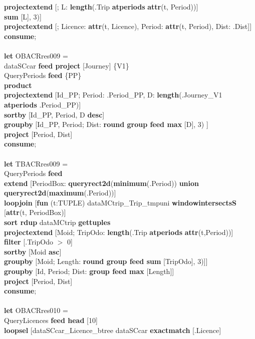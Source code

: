 \documentclass[a4paper]{article}
\newcommand{\op}[1]{\textbf{#1}}
\begin{document}
\begin{scriptsize}
\begin{tabbing}
\>\>\>\>\op{projectextend} [; L: \op{length}(.Trip \op{atperiods} \op{attr}(t, Period))]\\
\>\>\>\op{sum} [L], 3)]\\
\>\>\op{projectextend} [; Licence: \op{attr}(t, Licence), Period: \op{attr}(t, Period), Dist: .Dist]]\\
\op{consume};\\
\\
\op{let} OBACRres009 =\\
\>dataSCcar \op{feed project} [Journey] \{V1\}\\
\>QueryPeriods \op{feed} \{PP\}\\
\>\op{product}\\
\>\op{projectextend} [Id\_PP; Period: .Period\_PP, D: \op{length}(.Journey\_V1 \op{atperiods} .Period\_PP)]\\
\>\op{sortby} [Id\_PP, Period, D \op{desc}]\\
\>\op{groupby} [Id\_PP, Period; Dist: \op{round group feed max} [D], 3) ]\\
\>\op{project} [Period, Dist]\\
\op{consume};\\
\\
\op{let} TBACRres009 =\\
\>QueryPeriods \op{feed}\\
\>\op{extend} [PeriodBox: \op{queryrect2d}(\op{minimum}(.Period)) \op{union queryrect2d}(\op{maximum}(.Period))]\\
\>\op{loopjoin} [\op{fun} (t:TUPLE) dataMCtrip\_Trip\_tmpuni \op{windowintersectsS} [\op{attr}(t, PeriodBox)]\\
\>\>\op{sort rdup} dataMCtrip \op{gettuples}\\
\>\>\op{projectextend} [Moid; TripOdo: \op{length}(.Trip \op{atperiods} \op{attr}(t,Period))]\\
\>\>\op{filter} [.TripOdo $>$ 0]\\
\>\>\op{sortby} [Moid \op{asc}]\\
\>\>\op{groupby} [Moid; Length: \op{round group feed sum} [TripOdo], 3)]]\\
\>\op{groupby} [Id, Period; Dist: \op{group feed max} [Length]]\\
\>\op{project} [Period, Dist]\\
\op{consume};\\
\\
\op{let} OBACRres010 =\\
\>QueryLicences \op{feed head} [10]\\
\>\>\op{loopsel} [dataSCcar\_Licence\_btree dataSCcar \op{exactmatch} [.Licence]\\

\end{tabbing}
\end{scriptsize}
\end{document}
